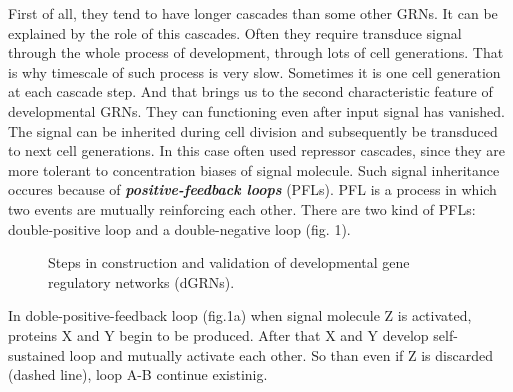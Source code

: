 \documentclass[a4paper, oneside]{report}
\begin{document}
First of all, they tend to have longer cascades than some other GRNs.
It can be explained by the role of this cascades.
Often they require transduce signal through the whole process of development, through lots of cell generations.
That is why timescale of such process is very slow.
Sometimes it is one cell generation at each cascade step.
And that brings us to the second characteristic feature of developmental GRNs.
They can functioning even after input signal has vanished.
The signal can be inherited during cell division and subsequently be transduced to next cell generations.
In this case often used repressor cascades, since they are more tolerant to concentration biases of signal molecule.
Such signal inheritance occures because of \textbf{\textit{positive-feedback loops}} (PFLs).
PFL is a process in which two events are mutually reinforcing each other.
There are two kind of PFLs: double-positive loop and a double-negative loop (fig. 1).

\begin{figure}[h]
	\caption{Steps in construction and validation of developmental gene regulatory networks (dGRNs).}
\end{figure}

In doble-positive-feedback loop (fig.1a) when signal molecule Z is activated, proteins X and Y begin to be produced. 
After that X and Y develop self-sustained loop and mutually activate each other.
So than even if Z is discarded (dashed line), loop A-B continue existinig.
\end{document}
